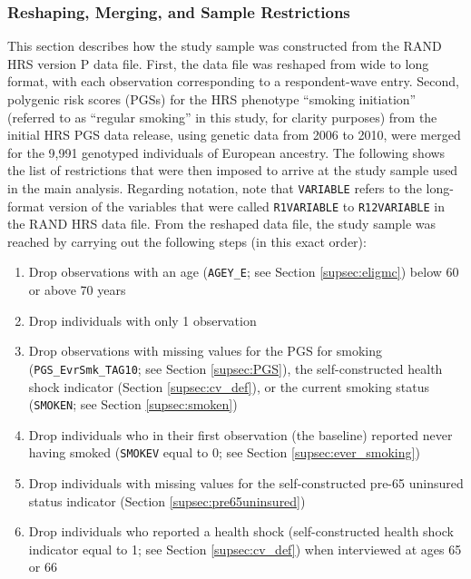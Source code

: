 \subsubsection{Reshaping, Merging, and Sample Restrictions}
\label{supsubsec:reshape}
This section describes how the study sample was constructed from the RAND HRS version P data file.
First, the data file was reshaped from wide to long format, with each observation corresponding to a respondent-wave entry. Second, polygenic risk scores (PGSs) for the HRS phenotype ``smoking initiation'' (referred to as ``regular smoking'' in this study, for clarity purposes) from the initial HRS PGS data release, using genetic data from 2006 to 2010, were merged for the 9,991 genotyped individuals of European ancestry. The following shows the list of restrictions that were then imposed to arrive at the study sample used in the main analysis. Regarding notation, note that {\tt VARIABLE} refers to the long-format version of the variables that were called {\tt R1VARIABLE} to {\tt R12VARIABLE} in the RAND HRS data file. From the reshaped data file, the study sample was reached by carrying out the following steps (in this exact order):

\begin{enumerate}
	\item Drop observations with an age ({\tt AGEY\_E}; see Section \ref{supsec:eligmc}) below 60 or above 70 years
	\item Drop individuals with only 1 observation
	\item Drop observations with missing values for the PGS for smoking ({\tt PGS\_EvrSmk\_TAG10}; see Section \ref{supsec:PGS}), the self-constructed health shock indicator (Section \ref{supsec:cv_def}), or the current smoking status ({\tt SMOKEN}; see Section \ref{supsec:smoken})
	\item Drop individuals who in their first observation (the baseline) reported never having smoked ({\tt SMOKEV} equal to 0; see Section \ref{supsec:ever_smoking})
	\item Drop individuals with missing values for the self-constructed pre-65 uninsured status indicator (Section \ref{supsec:pre65uninsured})
	\item Drop individuals who reported a health shock (self-constructed health shock indicator equal to 1; see Section \ref{supsec:cv_def}) when interviewed at ages 65 or 66\\
\end{enumerate}



